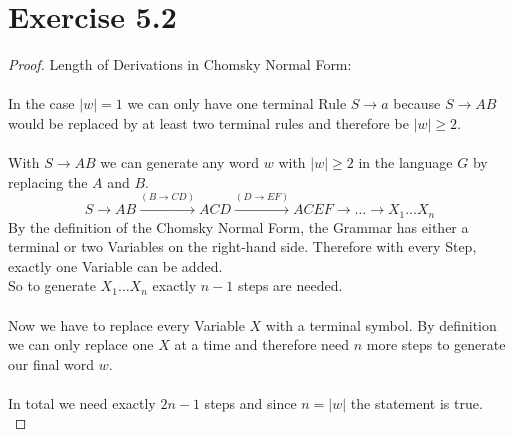 \documentclass{article} %
\newcommand{\homeworkNumber}{5}
\begin{document}
\section*{Exercise \homeworkNumber.2}
\begin{proof}
Length of Derivations in Chomsky Normal Form:\\\\
In the case $\vert w \vert = 1$ we can only have one terminal Rule $ S \to a $ because $ S \to AB $ would be replaced by at least two terminal rules and therefore be $\vert w \vert \geq 2$. \\\\
With $ S \to AB $ we can generate any word $w$ with $\vert w \vert \geq 2$ in the language $G$ by replacing the $A$ and $B$.
$$S \to AB \xrightarrow{(B \to CD)} ACD \xrightarrow{(D \to EF)} ACEF \to \dots \to X_1 \dots X_n$$
By the definition of the Chomsky Normal Form, the Grammar has either a terminal or two Variables on the right-hand side. Therefore with every Step, exactly one Variable can be added.\\
So to generate $X_1 \dots X_n$ exactly $n-1$ steps are needed.\\\\
Now we have to replace every Variable $X$ with a terminal symbol. By definition we can only replace one $X$ at a time and therefore need $n$ more steps to generate our final word $w$.\\\\
In total we need exactly $2n-1$ steps and since $n = \vert w \vert$ the statement is true.\\
\end{proof}
\end{document}
